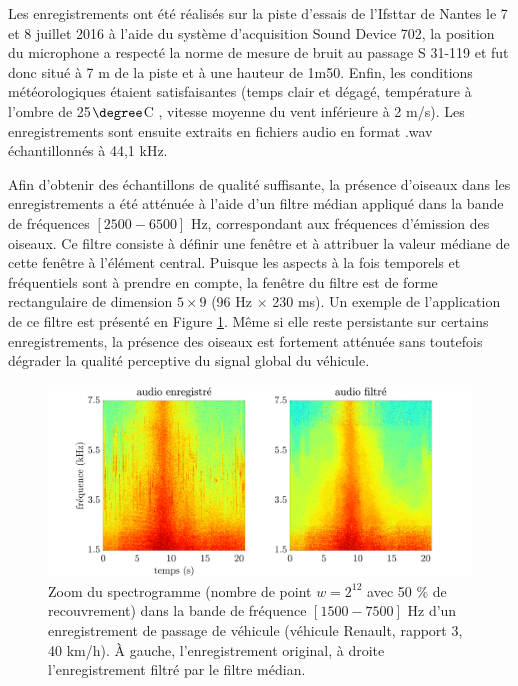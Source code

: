 

Les enregistrements ont été réalisés sur la piste d'essais de l'Ifsttar de Nantes le 7 et 8 juillet 2016 à l'aide du système d'acquisition Sound Device 702, la position du microphone a respecté la norme de mesure de bruit au passage S 31-119 et fut donc situé à 7 m de la piste et à une hauteur de 1m50. Enfin, les conditions météorologiques étaient satisfaisantes (temps clair et dégagé, température à l'ombre de 25$\degree$C , vitesse moyenne du vent inférieure à 2 m/s). Les enregistrements sont ensuite extraits en fichiers audio en format .wav échantillonnés à 44,1 kHz.

Afin d'obtenir des échantillons de qualité suffisante, la présence d'oiseaux dans les enregistrements a été atténuée à l'aide d'un filtre médian \cite{fitzgerald_harmonic/percussive_2010} appliqué dans la bande de fréquences $\left[2500 - 6500\right]$ Hz, correspondant aux fréquences d'émission des oiseaux. Ce filtre consiste à définir une fenêtre et à attribuer la valeur médiane de cette fenêtre à l'élément central. Puisque les aspects à la fois temporels et fréquentiels sont à prendre en compte, la fenêtre du filtre est de forme rectangulaire de dimension $5 \times 9$ (96 Hz $\times$ 230 ms). Un exemple de l'application de ce filtre est présenté en Figure \ref{fig:filtre_median}. Même si elle reste persistante sur certains enregistrements, la présence des oiseaux est fortement atténuée sans toutefois dégrader la qualité perceptive du signal global du véhicule.

\begin{figure}[t]
\centering
\includegraphics[width=.9\textwidth]{./figures/autres/filtrageMedian_VL1_R3_40_FR.pdf}
\caption{Zoom du spectrogramme (nombre de point $w = 2^{12}$ avec 50 $\%$ de recouvrement) dans la bande de fréquence $\left[1500-7500 \right]$ Hz d'un enregistrement de passage de véhicule (véhicule Renault, rapport 3, 40 km/h). \`A gauche, l'enregistrement original, à droite l'enregistrement filtré par le filtre médian.}
\label{fig:filtre_median}
\end{figure}


